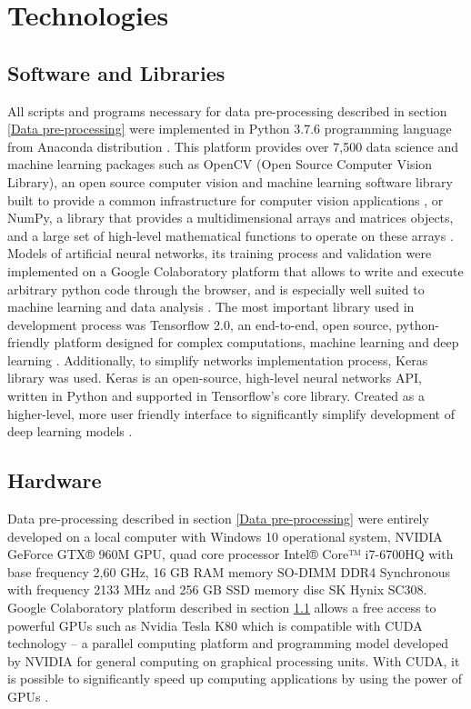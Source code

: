\chapter{Technologies}
\section{Software and Libraries}
\label{Software and Libraries}
All scripts and programs necessary for data pre-processing described in section \ref{Data pre-processing} were implemented in Python 3.7.6 programming language \cite{python_bib} from Anaconda distribution \cite{anaconda_bib}. This platform provides over 7,500 data science and machine learning packages such as OpenCV (Open Source Computer Vision Library), an open source computer vision and machine learning software library built to provide a common infrastructure for computer vision applications \cite{opencv_bib}, or NumPy, a library that provides a multidimensional arrays and matrices objects, and a large set of high-level mathematical functions to operate on these arrays \cite{numpy_bib}.\\

Models of artificial neural networks, its training process and validation were implemented on a Google Colaboratory platform that allows to write and execute arbitrary python code through the browser, and is especially well suited to machine learning and data analysis \cite{colab_bib}. The most important library used in development process was Tensorflow 2.0, an end-to-end, open source, python-friendly platform designed for complex computations, machine learning and deep learning \cite{tensorflow_bib}. Additionally, to simplify networks implementation process, Keras library was used. Keras is an open-source, high-level neural networks API, written in Python and supported in Tensorflow's core library. Created as a higher-level, more user friendly interface to significantly simplify development of deep learning models \cite{keras_bib}.

\section{Hardware}
Data pre-processing described in section \ref{Data pre-processing} were entirely developed on a local computer with Windows 10 operational system, NVIDIA GeForce GTX® 960M GPU, quad core processor Intel® Core™ i7-6700HQ with base frequency 2,60 GHz, 16 GB RAM memory SO-DIMM DDR4 Synchronous with frequency 2133 MHz and 256 GB SSD memory disc SK Hynix SC308.\\

Google Colaboratory platform described in section \ref{Software and Libraries} allows a free access to powerful GPUs such as Nvidia Tesla K80 \cite{teslak80_bib} which is compatible with CUDA technology -- a parallel computing platform and programming model developed by NVIDIA for general computing on graphical processing units. With CUDA, it is possible to significantly speed up computing applications by using the power of GPUs \cite{cuda_bib}.